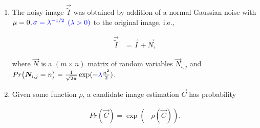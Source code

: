 \begin{enumerate}
	\item{The noisy image $\vec{\widetilde{I}}$ was obtained by addition of a normal Gaussian noise with $\mu=0,{\color{blue}{\sigma=\lambda^{-1/2}}}$ ${\color{blue}{(\lambda>0)}}$ to the original image, i.e., 
		\begin{assumption}
		\begin{align}
			\vec{\widetilde{I}} &= \vec{I} + \vec{N},
		\label{ch1:denoising-assumption-1}
		\end{align} 
		\end{assumption}
where $\vec{N}$ is a $(m \times n)$ matrix of random variables $\vec{N}_{i,j}$ and $Pr\big( \bm{N}_{i,j} = n \big) = \frac{1}{\sqrt{2\pi}}\exp(- {\color{blue}{ \lambda }} \frac{n^2}{2} )$.		
	}
	\item{Given some function $\rho$, a candidate image estimation $\vec{C}$ has probability	
	\begin{assumption}
	\begin{align}
		Pr(\vec{C}) = \exp(-\rho(\vec{C})).
		\label{ch1:denoising-assumption-2}
	\end{align}	 
	\end{assumption}
	}
\end{enumerate}


